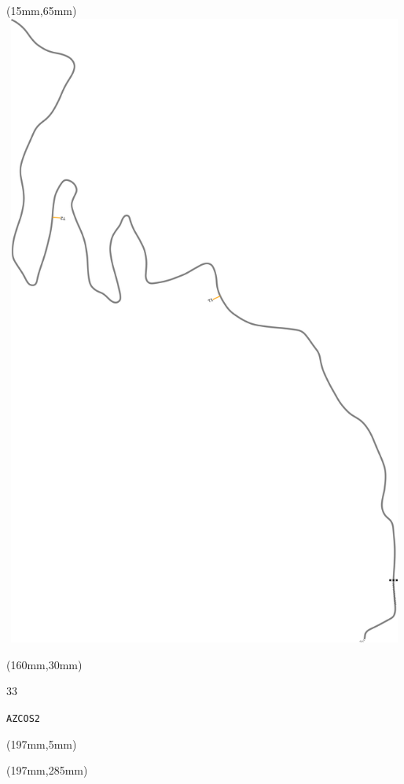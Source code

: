 \begin{textblock*}{185mm}(15mm,65mm)%
\centering
\mbox{\includegraphics[width=185mm,height=210mm,keepaspectratio]{PT/AZCOS2.pdf}}
\end{textblock*}
\begin{textblock*}{40mm}(160mm,30mm)%
\Large
\par{} 
\par33 
\par\hfill\tiny\tt AZCOS2\\
\end{textblock*}
\begin{textblock*}{20mm}(197mm,5mm)%
\fbox{\thepage}
\label{AZCOS2}
\end{textblock*}
\begin{textblock*}{20mm}(197mm,285mm)%
\fbox{\thepage}
\end{textblock*}

